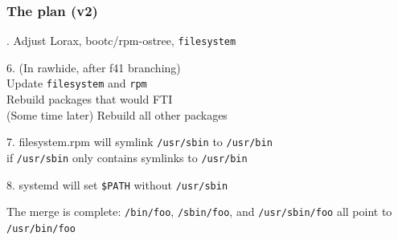 \documentclass[]{beamer}
\newcommand\pp\pause
\begin{document}
\begin{frame}[fragile]
  \frametitle{The plan (v2)}

  \pp
  5. Adjust Lorax, bootc/rpm-ostree, \texttt{filesystem}
  \\\pp

  6. (In rawhide, after f41 branching)\\
  Update \texttt{filesystem} and \texttt{rpm}\\
  Rebuild packages that would FTI\\
  (Some time later) Rebuild all other packages
  \\\pp

  7. filesystem.rpm will symlink \texttt{/usr/sbin} to \texttt{/usr/bin}\\
  if \texttt{/usr/sbin} only contains symlinks to \texttt{/usr/bin}
  \\\pp

  8. systemd will set \texttt{\$PATH} without \texttt{/usr/sbin}
  \\\pp

  The merge is complete: \texttt{/bin/foo}, \texttt{/sbin/foo}, and
  \texttt{/usr/sbin/foo} all point to \texttt{/usr/bin/foo}
\end{frame}
\end{document}
